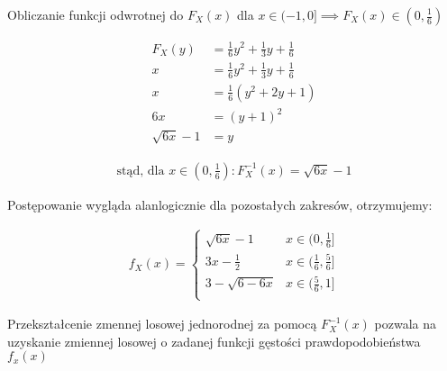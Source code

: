 \documentclass[11pt]{extarticle}
\begin{document}
	\pagebreak

	Obliczanie funkcji odwrotnej do \( F_X(x)\) dla \( x \in (-1, 0] \implies F_X(x) \in (0, \frac{1}{6}) \)

	\begin{align}
		F_X(y) &= \frac{1}{6}y^2 + \frac{1}{3}y + \frac{1}{6} \\
		x &= \frac{1}{6}y^2 + \frac{1}{3}y + \frac{1}{6} \\
		x &= \frac{1}{6} (y^2 + 2y + 1) \\
		6x &= (y + 1)^2 \\
		\sqrt{6x} - 1 &= y
	\end{align}

	\begin{align}
		\text{stąd, dla } x \in (0, \frac{1}{6}) : F_X^{-1}(x) = \sqrt{6x} - 1
	\end{align}

	Postępowanie wygląda alanlogicznie dla pozostałych zakresów, otrzymujemy:

	\begin{align}
		f_X(x) = \begin{cases} 
			\sqrt{6x} - 1 		& x \in (0, \frac{1}{6}] \\
			3x - \frac{1}{2}	& x \in (\frac{1}{6}, \frac{5}{6}] \\
			3 - \sqrt{6-6x} 	& x \in (\frac{5}{6}, 1] \\
		\end{cases}
	\end{align}

	Przekształcenie zmennej losowej jednorodnej za pomocą \( F_X^{-1}(x) \)
	pozwala na uzyskanie zmiennej losowej o zadanej funkcji gęstości prawdopodobieństwa \( f_x(x) \)
	
\end{document}
